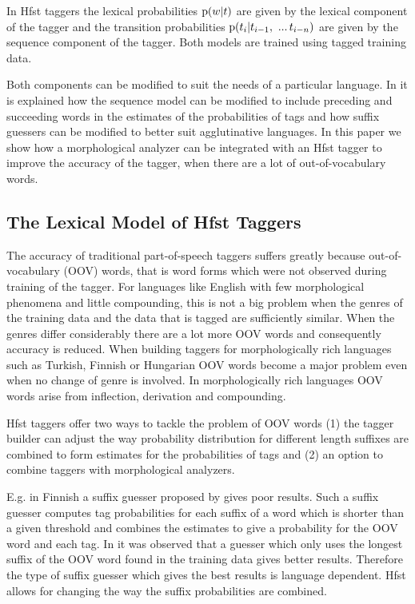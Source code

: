 \documentclass{llncs}
\begin{document}
In Hfst taggers the lexical probabilities ${\rm p}(w|t)$ are given by
 the lexical component of the tagger and the transition probabilities
 ${\rm p}(t_i | t_{i - 1},\ ...\, t_{i-n})$ are given by the sequence
 component of the tagger. Both models are trained using tagged
 training data.

Both components can be modified to suit the needs of a particular
 language. In \cite{Silfverberg/2011} it is explained how the sequence
 model can be modified to include preceding and succeeding words in
 the estimates of the probabilities of tags and how suffix guessers
 can be modified to better suit agglutinative languages. In this paper
 we show how a morphological analyzer can be integrated with an Hfst
 tagger to improve the accuracy of the tagger, when there are a lot of
 out-of-vocabulary words.


\subsection{The Lexical Model of Hfst Taggers}

The accuracy of traditional part-of-speech taggers suffers greatly
 because out-of-vocabulary (OOV) words, that is word forms which were
 not observed during training of the tagger. For languages like
 English with few morphological phenomena and little compounding, this
 is not a big problem when the genres of the training data and the data
 that is tagged are sufficiently similar. When the genres differ
 considerably there are a lot more OOV words and consequently accuracy
 is reduced. When building taggers for morphologically rich languages
 such as Turkish, Finnish or Hungarian OOV words become a major
 problem even when no change of genre is involved. In morphologically
 rich languages OOV words arise from inflection, derivation and
 compounding.
 
Hfst taggers offer two ways to tackle the problem of OOV words (1) the
 tagger builder can adjust the way probability distribution for
 different length suffixes are combined to form estimates for the
 probabilities of tags and (2) an option to combine taggers with
 morphological analyzers.

E.g. in Finnish a suffix guesser proposed by \cite{Brants:2000} gives
 poor results. Such a suffix guesser computes tag probabilities for
 each suffix of a word which is shorter than a given threshold and
 combines the estimates to give a probability for the OOV word and
 each tag. In \cite{Silfverberg/2011} it was observed that a guesser
 which only uses the longest suffix of the OOV word found in the
 training data gives better results. Therefore the type of suffix
 guesser which gives the best results is language dependent. Hfst
 allows for changing the way the suffix probabilities are combined.
\end{document}
